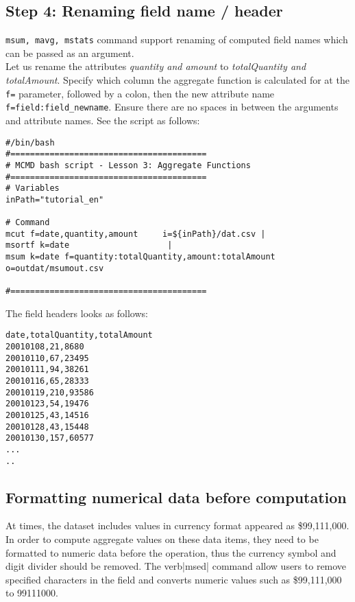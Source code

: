 \subsection{Step 4: Renaming field name / header }

\verb|msum, mavg, mstats| command support renaming of computed field names which can be passed as an argument. \\

Let us rename the attributes \emph{quantity \emph{and} amount} to \emph{totalQuantity \emph{and} totalAmount}. Specify which column the aggregate function is calculated for at the \verb|f=| parameter, followed by a colon, then the new attribute name \verb|f=field:field_newname|. Ensure there are no spaces in between the arguments and attribute names. See the script as follows:
\\

\begin{verbatim}
#/bin/bash
#========================================
# MCMD bash script - Lesson 3: Aggregate Functions
#========================================
# Variables
inPath="tutorial_en"

# Command 
mcut f=date,quantity,amount     i=${inPath}/dat.csv |
msortf k=date                    |
msum k=date f=quantity:totalQuantity,amount:totalAmount  o=outdat/msumout.csv

#========================================
\end{verbatim}

The field headers looks as follows: 

\begin{verbatim}
date,totalQuantity,totalAmount
20010108,21,8680
20010110,67,23495
20010111,94,38261
20010116,65,28333
20010119,210,93586
20010123,54,19476
20010125,43,14516
20010128,43,15448
20010130,157,60577
...
..
\end{verbatim}

\subsection{Formatting numerical data before computation} 
    
At times, the dataset includes values in currency format appeared as \$99,111,000. \\

In order to compute aggregate values on these data items, they need to be formatted to numeric data before the operation, thus the currency symbol and digit divider should be removed. The verb|msed| command allow users to remove specified characters in the field and converts numeric values such as \$99,111,000 to 99111000. \\

